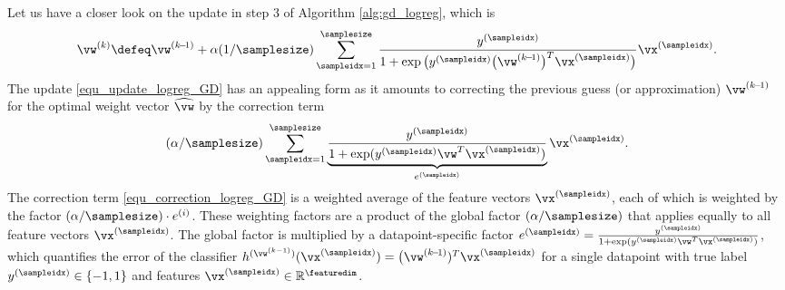 \documentclass[12pt]{report}
\begin{document}
Let us have a closer look on the update in step $3$ of Algorithm \ref{alg:gd_logreg}, which is 
\begin{equation}
\label{equ_update_logreg_GD}
\vw^{(k)} \defeq \vw^{(k\!-\!1)} + \alpha (1/\samplesize) \sum_{\sampleidx=1}^{\samplesize} \frac{y^{(\sampleidx)}}{1 + \exp \big( y^{(\sampleidx)} \big( \vw^{(k\!-\!1)}  \big)^{T} \vx^{(\sampleidx)}\big)} \vx^{(\sampleidx)}. 
\end{equation}
The update \eqref{equ_update_logreg_GD} has an appealing form as it amounts to correcting the previous 
guess (or approximation) $\vw^{(k\!-\!1)}$ for the optimal weight vector $\widehat{\vw}$ by the correction term 
\begin{equation}
\label{equ_correction_logreg_GD}
(\alpha/\samplesize) \sum_{\sampleidx=1}^{\samplesize} \underbrace{ \frac{y^{(\sampleidx)}}{1 + \exp ( y^{(\sampleidx)} \vw^{T} \vx^{(\sampleidx)})}}_{e^{(\sampleidx)}} \vx^{(\sampleidx)}. 
\end{equation}
The correction term \eqref{equ_correction_logreg_GD} is a weighted average 
of the feature vectors $\vx^{(\sampleidx)}$, each of which is weighted by the 
factor $(\alpha/\samplesize) \cdot e^{(i)}$. These weighting factors are a product 
of the global factor $(\alpha/\samplesize)$ that applies equally to all feature vectors 
$\vx^{(\sampleidx)}$. The global factor is multiplied by a datapoint-specific factor 
$e^{(\sampleidx)} =  \frac{y^{(\sampleidx)}}{1 + \exp ( y^{(\sampleidx)} \vw^{T} \vx^{(\sampleidx)})}$, 
which quantifies the error of the classifier  $h^{(\vw^{(k-1)})}(\vx^{(\sampleidx)}) =   \big(\vw^{(k\!-\!1)})^{T} \vx^{(\sampleidx)}$ 
for a single datapoint with true label $y^{(\sampleidx)} \in \{-1,1\}$ and features $\vx^{(\sampleidx)} \in \mathbb{R}^{\featuredim}$. 
\end{document}
